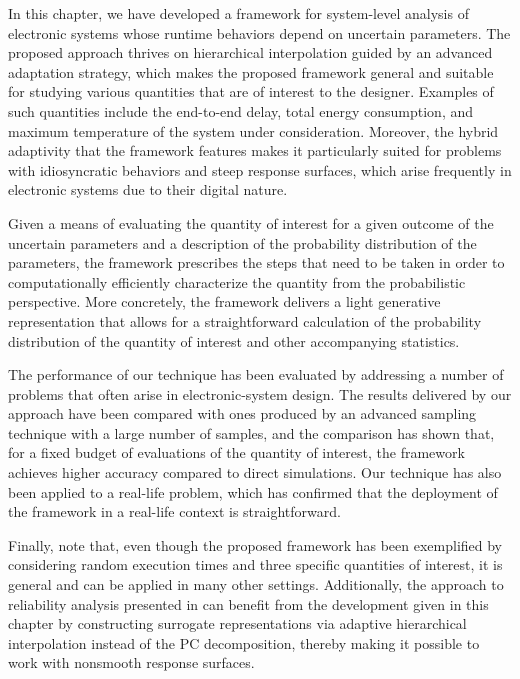 In this chapter, we have developed a framework for system-level analysis of
electronic systems whose runtime behaviors depend on uncertain parameters. The
proposed approach thrives on hierarchical interpolation guided by an advanced
adaptation strategy, which makes the proposed framework general and suitable for
studying various quantities that are of interest to the designer. Examples of
such quantities include the end-to-end delay, total energy consumption, and
maximum temperature of the system under consideration. Moreover, the hybrid
adaptivity that the framework features makes it particularly suited for problems
with idiosyncratic behaviors and steep response surfaces, which arise frequently
in electronic systems due to their digital nature.

Given a means of evaluating the quantity of interest for a given outcome of the
uncertain parameters and a description of the probability distribution of the
parameters, the framework prescribes the steps that need to be taken in order to
computationally efficiently characterize the quantity from the probabilistic
perspective. More concretely, the framework delivers a light generative
representation that allows for a straightforward calculation of the probability
distribution of the quantity of interest and other accompanying statistics.

The performance of our technique has been evaluated by addressing a number of
problems that often arise in electronic-system design. The results delivered by
our approach have been compared with ones produced by an advanced sampling
technique with a large number of samples, and the comparison has shown that, for
a fixed budget of evaluations of the quantity of interest, the framework
achieves higher accuracy compared to direct simulations. Our technique has also
been applied to a real-life problem, which has confirmed that the deployment of
the framework in a real-life context is straightforward.

Finally, note that, even though the proposed framework has been exemplified by
considering random execution times and three specific quantities of interest, it
is general and can be applied in many other settings. Additionally, the approach
to reliability analysis presented in  can
benefit from the development given in this chapter by constructing surrogate
representations via adaptive hierarchical interpolation instead of the \ac{PC}
decomposition, thereby making it possible to work with nonsmooth response
surfaces.
